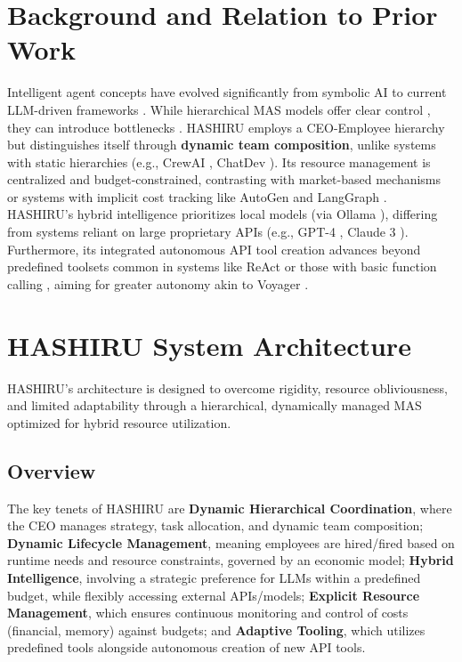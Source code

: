 \documentclass[twocolumn]{article}
\begin{document}
\section{Background and Relation to Prior Work}
Intelligent agent concepts have evolved significantly from symbolic AI \cite{russell2010artificial, shoham1994agent} to current LLM-driven frameworks \cite{wang2023survey, xi2023rise}. While hierarchical MAS models offer clear control \cite{dorri2018multi, horling2004survey}, they can introduce bottlenecks \cite{gaston2005agenta, gaston2005agentb}. HASHIRU employs a CEO-Employee hierarchy but distinguishes itself through \textbf{dynamic team composition}, unlike systems with static hierarchies (e.g., CrewAI \cite{crewai}, ChatDev \cite{qian2023communicative}). Its resource management is centralized and budget-constrained, contrasting with market-based mechanisms \cite{clearwater1996market} or systems with implicit cost tracking like AutoGen \cite{wu2023autogen} and LangGraph \cite{langgraph}. HASHIRU’s hybrid intelligence prioritizes local models (via Ollama \cite{ollama}), differing from systems reliant on large proprietary APIs (e.g., GPT-4 \cite{openai2023gpt4}, Claude 3 \cite{anthropic2024claude}). Furthermore, its integrated autonomous API tool creation advances beyond predefined toolsets common in systems like ReAct \cite{yao202202react} or those with basic function calling \cite{openai_func_calling}, aiming for greater autonomy akin to Voyager \cite{wang2023voyager}.

\section{HASHIRU System Architecture}
\label{sec:tech_architecture}
HASHIRU's architecture is designed to overcome rigidity, resource obliviousness, and limited adaptability through a hierarchical, dynamically managed MAS optimized for hybrid resource utilization.

\subsection{Overview}
The key tenets of HASHIRU are \textbf{Dynamic Hierarchical Coordination}, where the CEO manages strategy, task allocation, and dynamic team composition; \textbf{Dynamic Lifecycle Management}, meaning employees are hired/fired based on runtime needs and resource constraints, governed by an economic model; \textbf{Hybrid Intelligence}, involving a strategic preference for LLMs within a predefined budget, while flexibly accessing external APIs/models; \textbf{Explicit Resource Management}, which ensures continuous monitoring and control of costs (financial, memory) against budgets; and \textbf{Adaptive Tooling}, which utilizes predefined tools alongside autonomous creation of new API tools.
\end{document}
